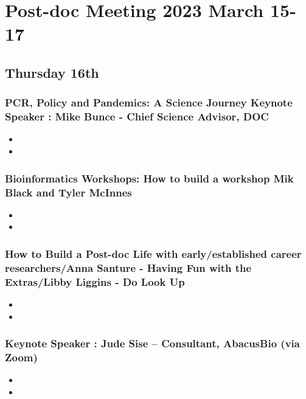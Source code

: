 \documentclass[document.tex]{subfiles}
\begin{document}
\chapter{Post-doc Meeting 2023 March 15-17}
\label{day:2023-03-15}

\section*{Thursday 16th}

    \subsection{PCR, Policy and Pandemics: A Science Journey
    Keynote Speaker : Mike Bunce - Chief Science Advisor, DOC}
    \begin{itemize}
    \item 
    \item 
    \end{itemize}

    \subsection{Bioinformatics Workshops: How to build a workshop Mik Black and Tyler McInnes}
    \begin{itemize}
    \item 
    \item 
    \end{itemize}

    \subsection{How to Build a Post-doc Life with early/established career researchers/Anna Santure - Having Fun with the Extras/Libby Liggins - Do Look Up}
    \begin{itemize}
    \item 
    \item 
    \end{itemize}

    \subsection{Keynote Speaker : Jude Sise – Consultant, AbacusBio (via Zoom)}
    \begin{itemize}
    \item 
    \item 
    \end{itemize}
\end{document}
